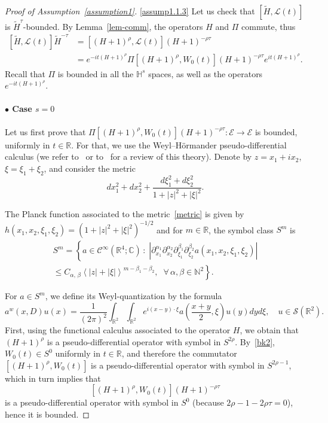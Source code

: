 \documentclass[AHL,Unicode,published]{cedram}
\newcommand{\C}{\mathbb{C}}
\newcommand{\R}{\mathbb{R}}
\newcommand{\HH}{\mathbb{H}}
\newcommand{\N}{\mathbb{N}}
\newcommand{\E}{\mathcal{E}}
\newcommand{\clC}{\mathcal{C}}
\renewcommand{\L}{\mathscr{L}}
\newcommand{\crS}{\mathscr{S}}
\newcommand{\wt}{\widetilde}
\newcommand{\<}{\langle}
\renewcommand{\>}{\rangle}
\let\oldforall\forall
\renewcommand*{\forall}{\mathrel{\oldforall}}
\newcommand{\R}{\mathbb{R}}
\begin{document}
\begin{proof}[{Proof of Assumption~\ref{assumption1}}]
\eqref{assump1.1.3} Let us check that $ [\wt{H}, \L(t)]$ is $\wt{H}^{\tau}$-bounded. By Lemma~\ref{lem-comm}, the operators $H$ and $\Pi$ commute, thus
\begin{align*}
\left[\wt{H}, \L(t)\right]\wt{H}^{-\tau}&=\left[(H+1)^{\rho}, \L(t)\right](H+1)^{-\rho \tau}\\
&= e^{-it (H+1)^{\rho}}\Pi\left[(H+1)^{\rho}, W_0(t)\right](H+1)^{-\rho \tau}e^{it (H+1)^{\rho}}.
\end{align*}
Recall that $\Pi$ is bounded in all the $\HH^s$ spaces, as well as the operators $e^{-it (H+1)^{\rho}}$.


\paragraph{$\bullet$ Case $s=0$}
Let us first prove that $\Pi[(H+1)^{\rho}, W_0(t)](H+1)^{-\rho \tau} : \E \longrightarrow \E$ is bounded, uniformly in $t\in \R$. For that, we use the Weyl--H\"ormander pseudo-differential calculus (we refer to~\cite{Helffer,Robert} or to~\cite[Chapter~3]{Parmeggiani} for a review of this theory). Denote by $ z=x_1+ix_2$, $\xi=\xi_1+\xi_2$, and consider the metric
\begin{equation}\label{metric}
dx_1^2+dx_2^2+\frac{d\xi_1^2+d\xi_2^2}{1+|z|^2+|\xi|^2}.
\end{equation}

The Planck function associated to the metric~\eqref{metric} is given by $h(x_1,x_2,\xi_1,\xi_2)=(1+|z|^2+|\xi|^2)^{-1/2}$ and for $m \in \R$, the symbol class $S^m$ is
\begin{multline*}
S^m =\left\{ a \in \clC^\infty\left(\R^4; \C\right)\,: \; \left|\partial_{x_1}^{\alpha_1} \partial_{x_2}^{\alpha_2} \partial_{\xi_1}^{\beta_1}\partial_{\xi_2}^{\beta_2} a(x_1,x_2,\xi_1,\xi_2)\right|\right. \\
\left. \leq C_{\alpha,\,\beta}\left\langle |z|+|\xi|\right\rangle^{m-\beta_1-\beta_2}, \;\; \forall \, \alpha, \beta \in \N^2\right\}.
\end{multline*}

For $a \in S^m$, we define its Weyl-quantization by the formula
\[
a^w(x,D)u(x)=\frac1{(2\pi)^2}\int_{\R^2}\int_{\R^2} e^{i(x-y)\cdot \xi}a\left(\frac{x+y}2,\xi\right) u(y)dyd \xi, \quad u\in \crS\left(\R^2\right).
\]
First, using the functional calculus associated to the operator $H$, we obtain that $(H+1)^\rho$ is a pseudo-differential operator with symbol in $S^{2\rho}$. By~\eqref{bk2}, $W_0(t)\in S^0$ uniformly in $t\in \R$, and therefore the commutator $[(H+1)^{\rho}, W_0(t)]$ is a pseudo-differential operator with symbol in $S^{2\rho-1}$, which in turn implies that
\[
\left[(H+1)^{\rho}, W_0(t)\right](H+1)^{-\rho \tau}
\]
is a pseudo-differential operator with symbol in $S^{0}$ (because $2\rho-1-2\rho \tau=0$), hence it is bounded.


\end{proof}
\end{document}

